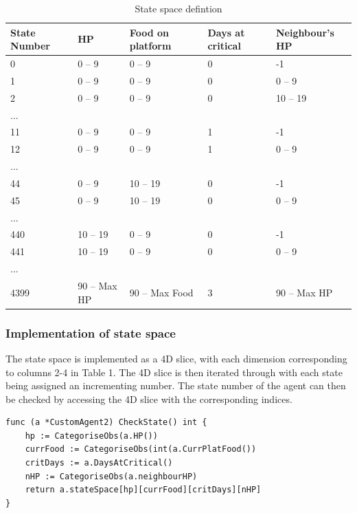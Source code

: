 \begin{table}
\centering
\caption{State space defintion}
\begin{adjustbox}{width=\columnwidth,center}
\begin{tabular}{@{}lllll@{}}
\toprule
State Number & HP          & Food on platform & Days at critical & Neighbour’s HP \\ \midrule
0            & 0 – 9       & 0 – 9            & 0                & -1             \\
1            & 0 – 9       & 0 – 9            & 0                & 0 – 9          \\
2            & 0 – 9       & 0 – 9            & 0                & 10 – 19        \\
...          &             &                  &                  &                \\
11           & 0 – 9       & 0 – 9            & 1                & -1             \\
12           & 0 – 9       & 0 – 9            & 1                & 0 – 9          \\
...          &             &                  &                  &                \\
44           & 0 – 9       & 10 – 19          & 0                & -1             \\
45           & 0 – 9       & 10 – 19          & 0                & 0 – 9          \\
...          &             &                  &                  &                \\
440          & 10 – 19     & 0 – 9            & 0                & -1             \\
441          & 10 – 19     & 0 – 9            & 0                & 0 – 9          \\
...          &             &                  &                  &                \\
4399         & 90 – Max HP & 90 – Max Food    & 3                & 90 – Max HP    \\ \bottomrule
\end{tabular}
\end{adjustbox}
\label{state-table}
\end{table}
\subsubsection{Implementation of state space}
The state space is implemented as a 4D slice, with each dimension corresponding to columns 2-4 in Table 1. The 4D slice is then iterated through with each state being assigned an incrementing number. The state number of the agent can then be checked by accessing the 4D slice with the corresponding indices.
\begin{lstlisting}
func (a *CustomAgent2) CheckState() int {
	hp := CategoriseObs(a.HP())
	currFood := CategoriseObs(int(a.CurrPlatFood())
	critDays := a.DaysAtCritical()
	nHP := CategoriseObs(a.neighbourHP)
	return a.stateSpace[hp][currFood][critDays][nHP]
}
\end{lstlisting}
